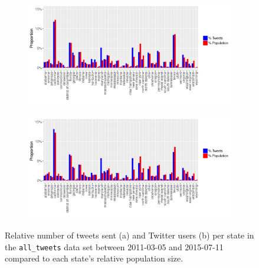 \documentclass[11pt, a4paper,twoside]{report}\usepackage[]{graphicx}\usepackage[]{color}
\begin{document}
\begin{figure}[H]
\centering
\begin{subfigure}[t]{1\textwidth}
  \includegraphics[width=1\linewidth]{14_activity_total_state_Twitter_full_aggregated.pdf}
  \caption{}
  \label{fig:tweets_state_full}
  \end{subfigure}
  
  \begin{subfigure}[t]{1\textwidth}
  \includegraphics[width=1\linewidth]{15_activity_total_user_state_Twitter_full_aggregated.pdf}
  \caption{}
    \label{fig:tweets_state_full_user}
  \end{subfigure}
\caption{Relative number of tweets sent (a) and Twitter users (b) per state in the \texttt{all\_tweets} data set between 2011-03-05 and 2015-07-11 compared to each state's relative population size.}
\label{fig:tweets_state}
\end{figure}
\end{document}
